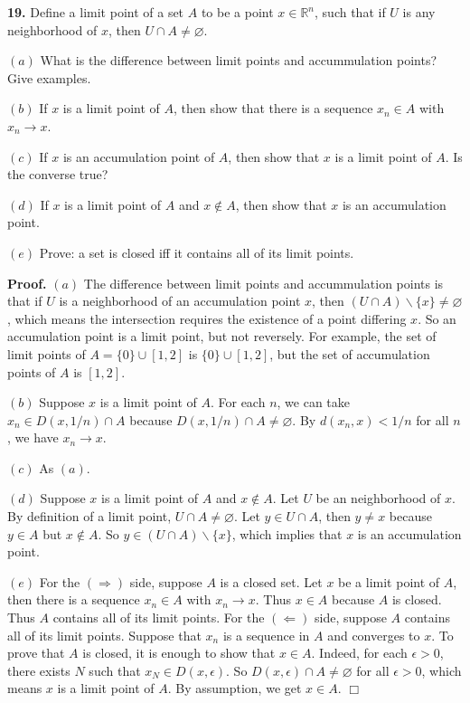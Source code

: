 \documentclass{article}
\begin{document}
    \textbf{19.} Define a limit point of a set $A$ to be a point
$x\in \mathbb{R}^n$, such that if $U$ is any neighborhood of $x$, then
$U\cap A \neq \varnothing$.

$(a)$ What is the difference between limit points and accummulation
points? Give examples.

$(b)$ If $x$ is a limit point of $A$, then show that there is a sequence
$x_n\in A$ with $x_n \to x$.

$(c)$ If $x$ is an accumulation point of $A$, then show that $x$ is a
limit point of $A$. Is the converse true?

$(d)$ If $x$ is a limit point of $A$ and $x\notin A$, then show that $x$
is an accumulation point.

$(e)$ Prove: a set is closed iff it contains all of its limit points.

\textbf{Proof.} $(a)$ The difference between limit points and
accummulation points is that if $U$ is a neighborhood of an accumulation
point $x$, then $(U \cap A)\backslash \{x\} \neq \varnothing$, which
means the intersection requires the existence of a point differing $x$.
So an accumulation point is a limit point, but not reversely. For
example, the set of limit points of $A = \{0\}\cup [1,2]$ is
$\{0\}\cup [1,2]$, but the set of accumulation points of $A$ is $[1,2]$.

$(b)$ Suppose $x$ is a limit point of $A$. For each $n$, we can take
$x_n \in D(x,1/n)\cap A$ because $D(x,1/n)\cap A \neq \varnothing$. By
$d(x_n,x)< 1/n$ for all $n$, we have $x_n \to x$.

$(c)$ As $(a)$.

$(d)$ Suppose $x$ is a limit point of $A$ and $x\notin A$. Let $U$ be an
neighborhood of $x$. By definition of a limit point,
$U \cap A\neq \varnothing$. Let $y \in U\cap A$, then $y \neq x$ because
$y \in A$ but $x\notin A$. So $y \in (U\cap A) \backslash \{x\}$, which
implies that $x$ is an accumulation point.

$(e)$ For the $(\Rightarrow)$ side, suppose $A$ is a closed set. Let $x$
be a limit point of $A$, then there is a sequence $x_n \in A$ with
$x_n \to x$. Thus $x\in A$ because $A$ is closed. Thus $A$ contains all
of its limit points. For the $(\Leftarrow)$ side, suppose $A$ contains
all of its limit points. Suppose that $x_n$ is a sequence in $A$ and
converges to $x$. To prove that $A$ is closed, it is enough to show that
$x\in A$. Indeed, for each $\epsilon > 0$, there exists $N$ such that
$x_N \in D(x,\epsilon)$. So $D(x,\epsilon)\cap A \neq \varnothing$ for
all $\epsilon > 0$, which means $x$ is a limit point of $A$. By
assumption, we get $x\in A$. $\Box$
\end{document}
